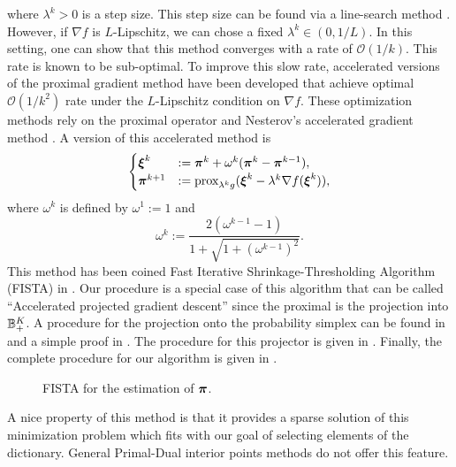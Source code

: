 where $\lambda^k > 0$ is a step size. This step size can be found via a line-search method \citep{Parikh:2014:PA:2693612.2693613}. However, if $\nabla f$ is $L$-Lipschitz, we can chose a fixed $\lambda^k\in (0,1/L)$. In this setting, one can show that this method converges with a rate of $\mathcal O(1/k)$. This rate is known to be sub-optimal. To improve this slow rate, accelerated versions of the proximal gradient method have been developed \citep{RePEc:cor:louvco:2007076,Beck:2009:FIS:1658360.1658364} that achieve optimal $\mathcal O(1/k^2)$ rate under the $L$-Lipschitz condition on $\nabla f$. These optimization methods rely on the proximal operator and Nesterov's accelerated gradient method \citep{Nesterov:1983wy}. A version of this accelerated method is
\begin{equation*}
    \begin{cases}
    \boldsymbol \xi^k &:= \boldsymbol \pi^k + \omega^k(\boldsymbol \pi^k-\boldsymbol \pi^{k-1}),\\
    \boldsymbol \pi^{k+1} &:= \textnormal{prox}_{\lambda^k g}(\boldsymbol \xi^k-\lambda^k\nabla f(\boldsymbol \xi^k)),
    \end{cases}
\end{equation*}
where $\omega^k$ is defined by $\omega^1 := 1$ and
\begin{equation*}
    \omega^k := \frac{2(\omega^{k-1}-1)}{1+\sqrt{1+(\omega^{k-1})^2}}.
\end{equation*}
This method has been coined Fast Iterative Shrinkage-Thresholding Algorithm (FISTA) in \citep{Beck:2009:FIS:1658360.1658364}. Our procedure is a special case of this algorithm that can be called ``Accelerated projected gradient descent'' since the proximal is the projection into ${\mathbb B}_+^K$. A procedure for the projection onto the probability simplex can be found in \citep{Duchi:2008:EPL:1390156.1390191} and a simple proof in \citep{Wang13projectiononto}. The procedure for this projector is given in . Finally, the complete procedure for our algorithm is given in .

\begin{figure}[h]
\begin{center}
   \caption{FISTA for the estimation of $\boldsymbol \pi$.}
   \label{fig:pi_fista}
\end{center}
\end{figure}
A nice property of this method is that it provides a sparse solution of this minimization problem 
which fits with our goal of selecting elements of the dictionary. General Primal-Dual interior 
points methods do not offer this feature.


